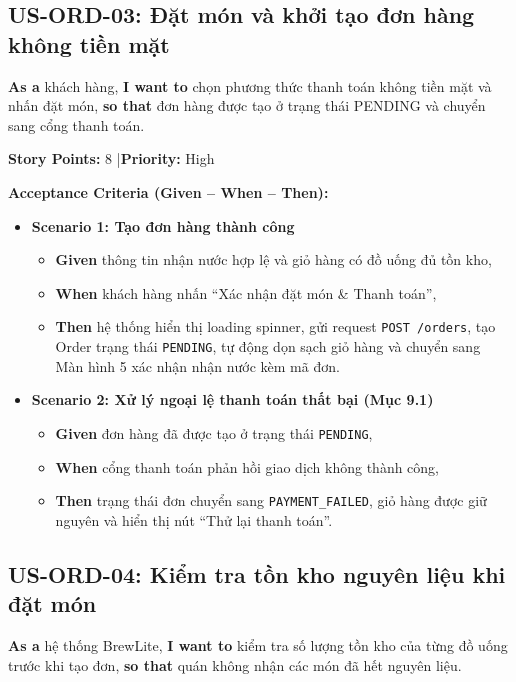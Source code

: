 \documentclass[12pt,a4paper]{article}
\begin{document}
\subsection{US-ORD-03: Đặt món và khởi tạo đơn hàng không tiền mặt}

\textbf{As a} khách hàng, \textbf{I want to} chọn phương thức thanh toán không tiền mặt và nhấn đặt món, \textbf{so that} đơn hàng được tạo ở trạng thái PENDING và chuyển sang cổng thanh toán.

\textbf{Story Points:} 8 \quad|\quad \textbf{Priority:} High

\textbf{Acceptance Criteria (Given -- When -- Then):}
\begin{itemize}
  \item \textbf{Scenario 1: Tạo đơn hàng thành công}
  \begin{itemize}
    \item \textbf{Given} thông tin nhận nước hợp lệ và giỏ hàng có đồ uống đủ tồn kho,
    \item \textbf{When} khách hàng nhấn ``Xác nhận đặt món \& Thanh toán'',
    \item \textbf{Then} hệ thống hiển thị loading spinner, gửi request \texttt{POST /orders}, tạo Order trạng thái \texttt{PENDING}, tự động dọn sạch giỏ hàng và chuyển sang Màn hình 5 xác nhận nhận nước kèm mã đơn.
  \end{itemize}
  \item \textbf{Scenario 2: Xử lý ngoại lệ thanh toán thất bại (Mục 9.1)}
  \begin{itemize}
    \item \textbf{Given} đơn hàng đã được tạo ở trạng thái \texttt{PENDING},
    \item \textbf{When} cổng thanh toán phản hồi giao dịch không thành công,
    \item \textbf{Then} trạng thái đơn chuyển sang \texttt{PAYMENT\_FAILED}, giỏ hàng được giữ nguyên và hiển thị nút ``Thử lại thanh toán''.
  \end{itemize}
\end{itemize}

\subsection{US-ORD-04: Kiểm tra tồn kho nguyên liệu khi đặt món}

\textbf{As a} hệ thống BrewLite, \textbf{I want to} kiểm tra số lượng tồn kho của từng đồ uống trước khi tạo đơn, \textbf{so that} quán không nhận các món đã hết nguyên liệu.
\end{document}
